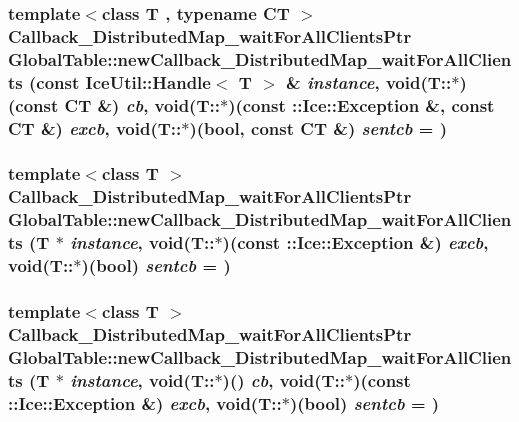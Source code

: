 \label{namespace_global_table_a200f0daaa6e176e4ee999d685777e3b7}
\hypertarget{namespace_global_table_a34e1115638b17b73dc68dc06125520b1}{
\subsubsection[{newCallback\_\-DistributedMap\_\-waitForAllClients}]{\setlength{\rightskip}{0pt plus 5cm}template$<$class T , typename CT $>$ {\bf Callback\_\-DistributedMap\_\-waitForAllClientsPtr} GlobalTable::newCallback\_\-DistributedMap\_\-waitForAllClients (const IceUtil::Handle$<$ T $>$ \& {\em instance}, \/  void(T::$\ast$)(const CT \&) {\em cb}, \/  void(T::$\ast$)(const ::Ice::Exception \&, const CT \&) {\em excb}, \/  void(T::$\ast$)(bool, const CT \&) {\em sentcb} = {})}}
\label{namespace_global_table_a34e1115638b17b73dc68dc06125520b1}
\hypertarget{namespace_global_table_af0a542865c3fb884c9b5703eb6d9dece}{
\subsubsection[{newCallback\_\-DistributedMap\_\-waitForAllClients}]{\setlength{\rightskip}{0pt plus 5cm}template$<$class T $>$ {\bf Callback\_\-DistributedMap\_\-waitForAllClientsPtr} GlobalTable::newCallback\_\-DistributedMap\_\-waitForAllClients (T $\ast$ {\em instance}, \/  void(T::$\ast$)(const ::Ice::Exception \&) {\em excb}, \/  void(T::$\ast$)(bool) {\em sentcb} = {})}}
\label{namespace_global_table_af0a542865c3fb884c9b5703eb6d9dece}
\hypertarget{namespace_global_table_ac9ffe632ea55c9e7441c89ffc0d325c8}{
\subsubsection[{newCallback\_\-DistributedMap\_\-waitForAllClients}]{\setlength{\rightskip}{0pt plus 5cm}template$<$class T $>$ {\bf Callback\_\-DistributedMap\_\-waitForAllClientsPtr} GlobalTable::newCallback\_\-DistributedMap\_\-waitForAllClients (T $\ast$ {\em instance}, \/  void(T::$\ast$)() {\em cb}, \/  void(T::$\ast$)(const ::Ice::Exception \&) {\em excb}, \/  void(T::$\ast$)(bool) {\em sentcb} = {})}}
